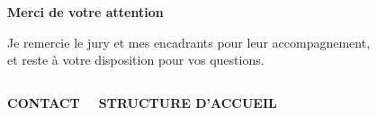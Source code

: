 \begingroup
{}
\begin{frame}[plain,c]
  \noindent
  {\seriffont\bfseries\fontsize{34}{38}\selectfont\textcolor{bg}{Merci de votre attention}\par}
  \vspace{0.35cm}
  {\fontsize{13}{17}\selectfont\textcolor{bg!85}%
    {Je remercie le jury et mes encadrants pour leur accompagnement,\\ et reste à votre disposition pour vos questions.}\par}
  \vspace{0.9cm}
  \begin{columns}[t]
      {\bfseries\fontsize{8}{10}\selectfont\textcolor{accentlt}{\MakeUppercase{Contact}}\par}
      \vspace{3pt}{\fontsize{11}{13}\selectfont\textcolor{bg}{jeremyhurel34@gmail.com}}
      {\bfseries\fontsize{8}{10}\selectfont\textcolor{accentlt}{\MakeUppercase{Structure d'accueil}}\par}
      \vspace{3pt}{\fontsize{11}{13}\selectfont\textcolor{bg}{Free Mobile · Beemo Technologie}}
  \end{columns}
  \vspace{0.9cm}
  \hbox{{\setlength{\fboxsep}{5pt}%
    \hspace{6pt}%
    \hspace{6pt}%
    }}
\end{frame}
\endgroup
